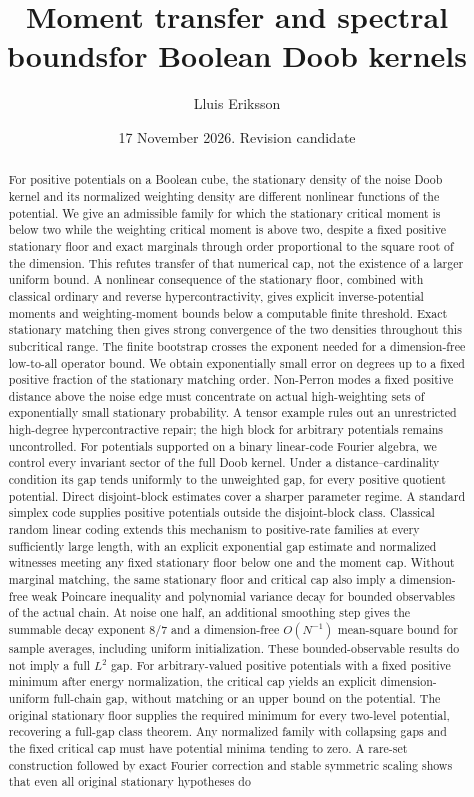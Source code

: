 \documentclass[11pt]{article}
\title{Moment transfer and spectral bounds\newline for Boolean Doob kernels}
\author{Lluis Eriksson}
\date{17 November 2026. Revision candidate}
\begin{document}
\maketitle
\begin{abstract}
For positive potentials on a Boolean cube, the stationary density of the noise Doob kernel and its normalized weighting density are different nonlinear functions of the potential. We give an admissible family for which the stationary critical moment is below two while the weighting critical moment is above two, despite a fixed positive stationary floor and exact marginals through order proportional to the square root of the dimension. This refutes transfer of that numerical cap, not the existence of a larger uniform bound. A nonlinear consequence of the stationary floor, combined with classical ordinary and reverse hypercontractivity, gives explicit inverse-potential moments and weighting-moment bounds below a computable finite threshold. Exact stationary matching then gives strong convergence of the two densities throughout this subcritical range. The finite bootstrap crosses the exponent needed for a dimension-free low-to-all operator bound. We obtain exponentially small error on degrees up to a fixed positive fraction of the stationary matching order. Non-Perron modes a fixed positive distance above the noise edge must concentrate on actual high-weighting sets of exponentially small stationary probability. A tensor example rules out an unrestricted high-degree hypercontractive repair; the high block for arbitrary potentials remains uncontrolled. For potentials supported on a binary linear-code Fourier algebra, we control every invariant sector of the full Doob kernel. Under a distance--cardinality condition its gap tends uniformly to the unweighted gap, for every positive quotient potential. Direct disjoint-block estimates cover a sharper parameter regime. A standard simplex code supplies positive potentials outside the disjoint-block class. Classical random linear coding extends this mechanism to positive-rate families at every sufficiently large length, with an explicit exponential gap estimate and normalized witnesses meeting any fixed stationary floor below one and the moment cap. Without marginal matching, the same stationary floor and critical cap also imply a dimension-free weak Poincare inequality and polynomial variance decay for bounded observables of the actual chain. At noise one half, an additional smoothing step gives the summable decay exponent $8/7$ and a dimension-free $O(N^{-1})$ mean-square bound for sample averages, including uniform initialization. These bounded-observable results do not imply a full $L^2$ gap. For arbitrary-valued positive potentials with a fixed positive minimum after energy normalization, the critical cap yields an explicit dimension-uniform full-chain gap, without matching or an upper bound on the potential. The original stationary floor supplies the required minimum for every two-level potential, recovering a full-gap class theorem. Any normalized family with collapsing gaps and the fixed critical cap must have potential minima tending to zero. A rare-set construction followed by exact Fourier correction and stable symmetric scaling shows that even all original stationary hypotheses do 
\end{abstract}
\end{document}
